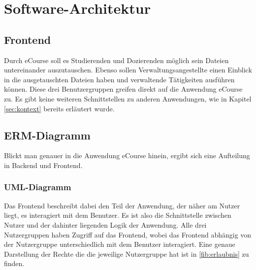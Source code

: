 \chapter{Software-Architektur}

\section{Frontend}
Durch eCourse soll es \gls{Studierende}n und \gls{Dozierende}n möglich sein Dateien untereinander auszutauschen. Ebenso sollen Verwaltungsangestellte einen Einblick in die ausgetauschten Dateien haben und verwaltende Tätigkeiten ausführen können. Diese drei Benutzergruppen greifen direkt auf die Anwendung eCourse zu. Es gibt keine weiteren Schnittstellen zu anderen Anwendungen, wie in Kapitel \ref{sec:kontext} bereits erläutert wurde. 

\section{ERM-Diagramm}
Blickt man genauer in die Anwendung eCourse hinein, ergibt sich eine Aufteilung in \gls{Backend} und \gls{Frontend}.

\subsection{UML-Diagramm}
Das \gls{Frontend} beschreibt dabei den Teil der Anwendung, der näher am Nutzer liegt, es interagiert mit dem Benutzer. Es ist also die Schnittstelle zwischen Nutzer und der dahinter liegenden Logik der Anwendung. Alle drei Nutzergruppen haben Zugriff auf das \gls{Frontend}, wobei das \gls{Frontend} abhängig von der Nutzergruppe unterschiedlich mit dem Benutzer interagiert. Eine genaue Darstellung der Rechte die die jeweilige Nutzergruppe hat ist in \ref{fib:erlaubnis} zu finden.

